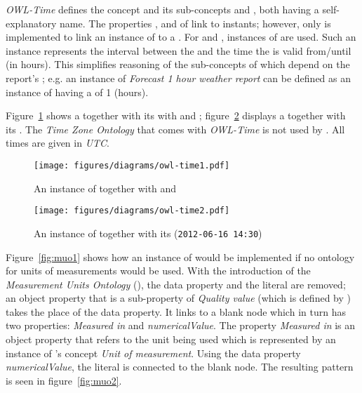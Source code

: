 \vspace{1em}

\emph{OWL-Time}\cite{owl-time} defines the concept  and its sub-concepts  and , both having a self-explanatory name. The properties ,  and  of  link to instants; however, only  is implemented to link an instance of  to a . For  and , instances of  are used. Such an instance represents the interval between the  and the time the  is valid from/until (in hours). This simplifies reasoning of the sub-concepts of  which depend on the report's ; e.g. an instance of \emph{Forecast 1 hour weather report} can be defined as an instance of  having a  of \num{1} (hours).

Figure~\ref{fig:owl_time1} shows a  together with its with  and ; figure~\ref{fig:owl_time2} displays a  together with its . The \emph{Time Zone Ontology} that comes with \emph{OWL-Time} is not used by \thinkhomeweather. All times are given in \emph{UTC}.

\begin{figure}
  \centering
  \texttt{[image: figures/diagrams/owl-time1.pdf]}
  \caption{An instance of  together with  and }
  \label{fig:owl_time1}
\end{figure}

\begin{figure}
  \centering
  \texttt{[image: figures/diagrams/owl-time2.pdf]}
  \caption{An instance of  together with its  (\texttt{2012-06-16~14:30})}
  \label{fig:owl_time2}
\end{figure}

\vspace{1em}

Figure~\ref{fig:muo1} shows how an instance of  would be implemented if no ontology for units of measurements would be used. With the introduction of the \emph{Measurement Units Ontology} (\muo), the data property and the literal are removed; an object property that is a sub-property of \emph{Quality value} (which is defined by \muo) takes the place of the data property. It links to a blank node which in turn has two properties: \emph{Measured in} and \emph{numericalValue}. The property \emph{Measured in} is an object property that refers to the unit being used which is represented by an instance of \muo's concept \emph{Unit of measurement}. Using the data property \emph{numericalValue}, the literal is connected to the blank node. The resulting pattern is seen in figure~\ref{fig:muo2}.

